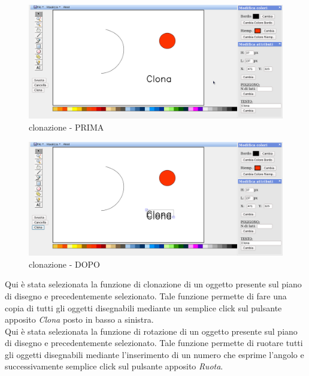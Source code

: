 \begin{figure}[!ht]
\centering
\includegraphics[scale=0.4]{images/clona.png}
\caption{clonazione - PRIMA}
\end{figure}
 
\begin{figure}[!ht]
\centering
\includegraphics[scale=0.4]{images/clona_dopo.png}
\caption{clonazione - DOPO}
\end{figure}
 
\vspace{100pt}
Qui \`e stata selezionata la funzione di clonazione di un oggetto presente sul piano di disegno e precedentemente selezionato. Tale funzione permette di fare una copia di tutti gli oggetti disegnabili mediante un semplice click sul pulsante apposito \textit{Clona} posto in basso a sinistra. \\
 
 
 
\vspace{100pt}
Qui \`e stata selezionata la funzione di rotazione di un oggetto presente sul piano di disegno e precedentemente selezionato. Tale funzione permette di ruotare tutti gli oggetti disegnabili mediante l'inserimento di un numero che esprime l'angolo e successivamente semplice click sul pulsante apposito \textit{Ruota}. \\
 
